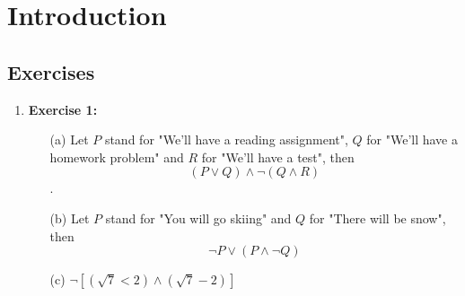 \documentclass{article} %
\begin{document}
    \section*{Introduction} %
    
    \subsection*{Exercises} %
    
    \begin{enumerate}
        \item \textbf{Exercise 1:}
        \begin{itemize}
            \item[(a)] Let \(P\) stand for "We'll have a reading assignment", \(Q\) for "We'll have a homework problem" and \(R\) for "We'll have a test", then \[(P \vee Q) \wedge \neg (Q \wedge R)\].
            \item[(b)] Let \(P\) stand for "You will go skiing" and \(Q\) for "There will be snow", then \[\neg P \vee (P \wedge \neg Q)\]
            \item[(c)] \( \neg [(\sqrt{7} < 2) \wedge (\sqrt{7} - 2)] \)
        \end{itemize} 
    \end{enumerate}
\end{document}
